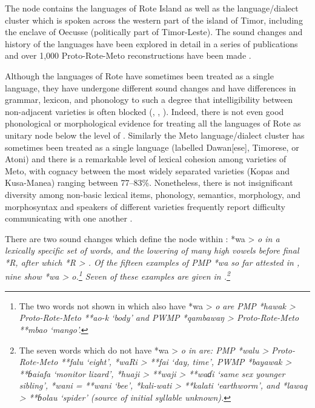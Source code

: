 The  node contains the languages of Rote Island
as well as the  language/dialect cluster which is spoken
across the western part of the island of Timor,
including the enclave of Oecusse (politically part of Timor-Leste).
The sound changes and history of the  languages
have been explored in detail in a series of publications
\citep{Edwards2016,Edwards2018a,Edwards2018c}
and over 1,000 Proto-Rote-Meto reconstructions
have been made \citep{Edwards2021}.

Although the languages of Rote have sometimes been treated as
a single language, they have undergone different sound changes
and have differences in grammar,
lexicon, and phonology to such a degree that intelligibility
between non-adjacent varieties is often blocked
(\citealp[47]{GrimesTherikGrimesJacob1997}, \citealp[233]{Fox2016}, \citealp[2--4]{Tamelan2021}).
Indeed, there is not even good phonological or morphological
evidence for treating all the languages of Rote as unitary node
below the level of .
Similarly the Meto language/dialect cluster has sometimes been
treated as a single language (labelled Dawan[ese],
Timorese, or Atoni) and there is a remarkable level of lexical
cohesion among varieties of Meto,
with cognacy between the most widely separated varieties (Kopas
and Kusa-Manea) ranging between 77--83{\%}.
Nonetheless, there is not insignificant diversity among non-basic
lexical items, phonology, semantics, morphology, and morphosyntax
and speakers of different varieties frequently report difficulty
communicating with one another \citep[6]{Edwards2020}.

There are two sound changes which define the 
node within : *wa > \it{o} in a lexically specific
set of words, and the lowering of many high vowels before final *R,
after which *R > {\0}.
Of the fifteen examples of PMP *wa so far attested in ,
nine show *wa > \it{o}.\footnote{
		The two words not shown in  which
		also have *wa > \it{o} are PMP *hawak > Proto-Rote-Meto **ao-k
		‘body’ and PWMP *qambawaŋ > Proto-Rote-Meto **mbao ‘mango’.}
Seven of these examples are given in .\footnote{
		The seven
		words which do not have *wa > \it{o} in  are:
		PMP *walu > Proto-Rote-Meto **falu ‘eight’,
		*waRi > **fai ‘day,
		time’, PWMP *bayawak > **ɓaiafa ‘monitor lizard’,
		*huaji > **waji > **waɗi ‘same sex younger sibling’,
		*wani = **wani ‘bee’,
		*kali-wati > **kalati ‘earthworm’,
		and *lawaq > **ɓolau ‘spider’ (source of initial syllable unknown).}

